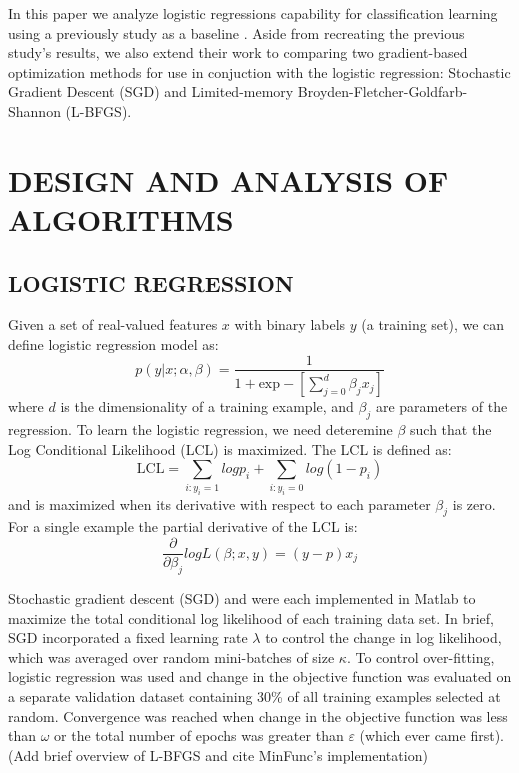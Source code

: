In this paper we analyze logistic regressions capability for classification learning using a previously study as a baseline \cite{t-logistic}. Aside from recreating the previous study's results, we also extend their work to comparing two gradient-based optimization methods for use in conjuction with the logistic regression: Stochastic Gradient Descent (SGD) and Limited-memory Broyden-Fletcher-Goldfarb-Shannon (L-BFGS).



\section{DESIGN AND ANALYSIS OF ALGORITHMS}
\label{sec:algorithms}

\subsection{LOGISTIC REGRESSION}
Given a set of real-valued features $x$ with binary labels $y$ (a training set), we can define logistic regression model as: 
\begin{equation}
    p( y | x ; \alpha , \beta )  = \frac{1}{1 + \textrm{exp}-[\sum_{j=0}^d \beta_j x_j]}
\end{equation}
where $d$ is the dimensionality of a training example, and $\beta_j$ are parameters of the regression. To learn the logistic regression, we need deteremine $\beta$ such that the Log Conditional Likelihood (LCL) is maximized. The LCL is defined as:
\begin{equation}
    \textrm{LCL} = \sum_{i:y_i=1} log p_i + \sum_{i:y_i=0} log (1-p_i)
\end{equation}
and is maximized when its derivative with respect to each parameter $\beta_j$ is zero. For a single example the partial derivative of the LCL is:
\begin{equation}
    \frac{\partial}{\partial \beta_j} log L(\beta ; x, y) = (y - p) x_j
\end{equation}




Stochastic gradient descent (SGD) and  were each implemented in Matlab to maximize the total conditional log likelihood of each training data set. In brief, SGD incorporated a fixed learning rate $\lambda$ to control the change in log likelihood, which was averaged over random mini-batches of size $\kappa$. To control over-fitting, logistic regression was used and change in the objective function was evaluated on a separate validation dataset containing 30\% of all training examples selected at random. Convergence was reached when change in the objective function was less than $\omega$ or the total number of epochs was greater than $\varepsilon$ (which ever came first). (Add brief overview of L-BFGS and cite MinFunc's implementation)

